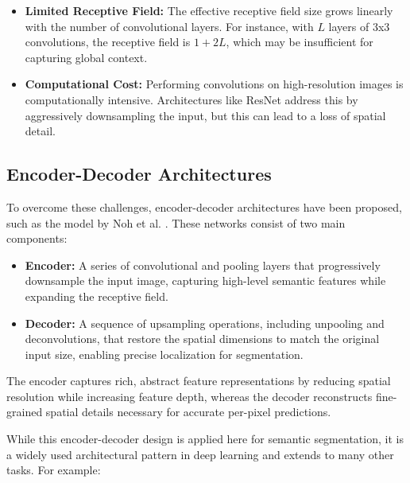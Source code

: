 \begin{itemize}
	\item \textbf{Limited Receptive Field:} The effective receptive field size grows linearly with the number of convolutional layers. For instance, with $L$ layers of 3x3 convolutions, the receptive field is $1 + 2L$, which may be insufficient for capturing global context.
	\item \textbf{Computational Cost:} Performing convolutions on high-resolution images is computationally intensive. Architectures like ResNet address this by aggressively downsampling the input, but this can lead to a loss of spatial detail.
\end{itemize}

\subsection{Encoder-Decoder Architectures}

\noindent To overcome these challenges, encoder-decoder architectures have been proposed, such as the model by Noh et al. \cite{noh2015_deconvnet}. These networks consist of two main components:

\begin{itemize}
	\item \textbf{Encoder:} A series of convolutional and pooling layers that progressively downsample the input image, capturing high-level semantic features while expanding the receptive field.
	\item \textbf{Decoder:} A sequence of upsampling operations, including unpooling and deconvolutions, that restore the spatial dimensions to match the original input size, enabling precise localization for segmentation.
\end{itemize}

\noindent The encoder captures rich, abstract feature representations by reducing spatial resolution while increasing feature depth, whereas the decoder reconstructs fine-grained spatial details necessary for accurate per-pixel predictions.

\newpage

\noindent While this encoder-decoder design is applied here for semantic segmentation, it is a widely used architectural pattern in deep learning and extends to many other tasks. For example:

